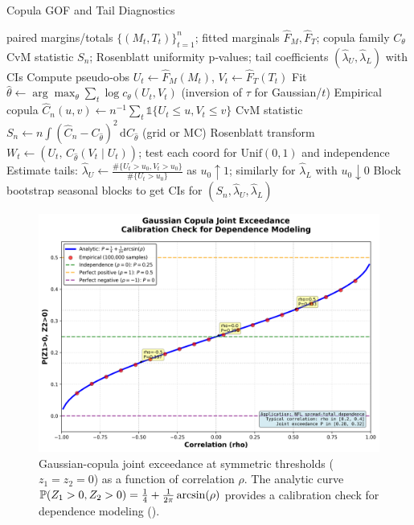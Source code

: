 

\begin{algorithm}[t]
  \caption{Copula GOF and Tail Diagnostics}
  \label{alg:copula-gof}
  \begin{algorithmic}[1]
    \Require paired margins/totals $\{(M_t,T_t)\}_{t=1}^n$; fitted marginals $\hat F_M,\hat F_T$; copula family $C_\theta$
    \Ensure CvM statistic $S_n$; Rosenblatt uniformity p‑values; tail coefficients $(\hat\lambda_U,\hat\lambda_L)$ with CIs
    \State Compute pseudo‑obs $U_t\leftarrow\hat F_M(M_t)$, $V_t\leftarrow\hat F_T(T_t)$
    \State Fit $\hat\theta\leftarrow\arg\max_\theta\sum_t \log c_\theta(U_t,V_t)$ (inversion of $\tau$ for Gaussian/$t$)
    \State Empirical copula $\hat C_n(u,v)\leftarrow n^{-1}\sum_t\mathbb{1}\{U_t\le u,V_t\le v\}$
    \State CvM statistic $S_n\leftarrow n\int(\hat C_n-C_{\hat\theta})^2\,\mathrm d C_{\hat\theta}$ (grid or MC)
    \State Rosenblatt transform $W_t\leftarrow(U_t,\, C_{\hat\theta}(V_t\mid U_t))$; test each coord for $\mathrm{Unif}(0,1)$ and independence
    \State Estimate tails: $\hat\lambda_U\leftarrow\frac{\#\{U_t>u_0, V_t>u_0\}}{\#\{U_t>u_0\}}$ as $u_0\uparrow1$; similarly for $\hat\lambda_L$ with $u_0\downarrow0$
    \State Block bootstrap seasonal blocks to get CIs for $(S_n,\hat\lambda_U,\hat\lambda_L)$
  \end{algorithmic}
\end{algorithm}

\begin{figure}[t]
  \centering
  \includegraphics[width=0.9\linewidth]{../figures/joint_exceedance_vs_rho.png}
  \caption[Gaussian copula joint exceedance]{Gaussian-copula joint exceedance at symmetric thresholds ($z_1=z_2=0$) as a function of correlation $\rho$. The analytic curve $\mathbb{P}(Z_1>0,Z_2>0)=\tfrac14+\tfrac{1}{2\pi}\arcsin(\rho)$ provides a calibration check for dependence modeling ().}
  \label{fig:copula-joint}
\end{figure}

